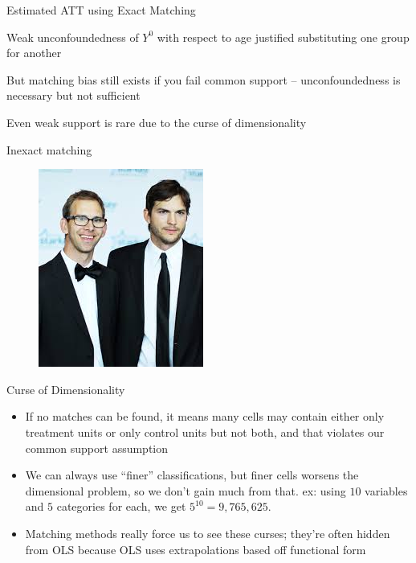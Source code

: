 \documentclass{beamer}
\begin{document}
\begin{frame}{Estimated ATT using Exact Matching}


Weak unconfoundedness of $Y^0$ with respect to age justified substituting one group for another

\bigskip

But matching bias still exists if you fail common support -- unconfoundedness is necessary but not sufficient

\bigskip

Even weak support is rare due to the curse of dimensionality

\end{frame}





\begin{frame}{Inexact matching}

\begin{figure}[!t]\centering
\includegraphics[scale=0.75]{./lecture_includes/fraternal_twins}
\end{figure}

\end{frame}


\begin{frame}{Curse of Dimensionality}
	
	\begin{itemize}
	\item If no matches can be found, it means many cells may contain either only treatment units or only control units but not both, and that violates our common support assumption
	\item We can always use ``finer'' classifications, but finer cells worsens the dimensional problem, so we don't gain  much from that.  ex: using $10$ variables and $5$ categories for each, we get $5^{10} = 9,765,625$.  
	\item Matching methods really force us to see these curses; they're often hidden from OLS because OLS uses extrapolations based off functional form
	\end{itemize}
\end{frame}	
\end{document}
